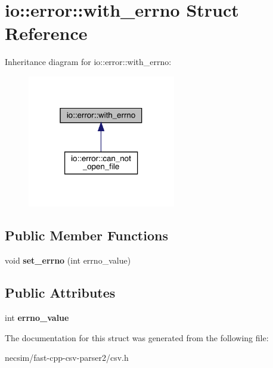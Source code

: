 \hypertarget{structio_1_1error_1_1with__errno}{}\section{io\+:\+:error\+:\+:with\+\_\+errno Struct Reference}
\label{structio_1_1error_1_1with__errno}


Inheritance diagram for io\+:\+:error\+:\+:with\+\_\+errno\+:
\nopagebreak
\begin{figure}[H]
\begin{center}
\leavevmode
\includegraphics[width=183pt]{structio_1_1error_1_1with__errno__inherit__graph}
\end{center}
\end{figure}
\subsection*{Public Member Functions}
\begin{DoxyCompactItemize}
\item 
void {\bfseries set\+\_\+errno} (int errno\+\_\+value)\hypertarget{structio_1_1error_1_1with__errno_a572cfa4b4a96792cd1d17dc9ad2eb5a9}{}\label{structio_1_1error_1_1with__errno_a572cfa4b4a96792cd1d17dc9ad2eb5a9}

\end{DoxyCompactItemize}
\subsection*{Public Attributes}
\begin{DoxyCompactItemize}
\item 
int {\bfseries errno\+\_\+value}\hypertarget{structio_1_1error_1_1with__errno_a99dcacba02cb53351fe64d7e064406be}{}\label{structio_1_1error_1_1with__errno_a99dcacba02cb53351fe64d7e064406be}

\end{DoxyCompactItemize}


The documentation for this struct was generated from the following file\+:\begin{DoxyCompactItemize}
\item 
necsim/fast-\/cpp-\/csv-\/parser2/csv.\+h\end{DoxyCompactItemize}
